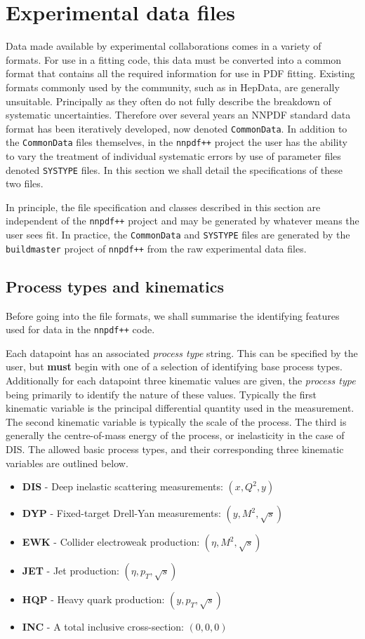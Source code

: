 \documentclass[11pt]{article}
\begin{document}
\section{Experimental data files}\label{sec:experimental}
Data made available by experimental collaborations comes in a variety of formats. For use in a fitting code, this data must be converted into a common format
that contains all the required information for use in PDF fitting. Existing formats commonly used by the community, such as in HepData, are generally unsuitable.
Principally as they often do not fully describe the breakdown of systematic uncertainties. Therefore over several years an NNPDF standard data format has been
iteratively developed, now denoted {\tt CommonData}. In addition to the {\tt CommonData} files themselves, in the {\tt nnpdf++} project the user has the ability to vary
the treatment of individual systematic errors by use of parameter files denoted {\tt SYSTYPE} files. In this section we shall detail the specifications of these two files.

In principle, the file specification and classes described in this section are independent of the {\tt nnpdf++} project and may be generated by whatever means the user sees fit.
In practice, the {\tt CommonData} and {\tt SYSTYPE} files are generated by the {\tt buildmaster} project of {\tt nnpdf++} from the raw experimental data files.

\subsection{Process types and kinematics}
Before going into the file formats, we shall summarise the identifying features used for data in the {\tt nnpdf++} code. 

Each datapoint has an associated \emph{process type} string. This can be specified by the user, but \textbf{must} begin with one of a selection of identifying base process types. Additionally for each datapoint three kinematic values are given, the \emph{process type} being primarily to identify the nature of these values. Typically the first kinematic variable is the principal differential quantity used in the measurement. The second kinematic variable is typically the scale of the process. The third is generally the centre-of-mass energy of the process, or inelasticity in the case of DIS. The allowed basic process types, and their corresponding three kinematic variables are outlined below.

\begin{itemize}
\item \textbf{DIS} - Deep inelastic scattering measurements: $(x,Q^2,y)$
\item \textbf{DYP} - Fixed-target Drell-Yan measurements: $(y,M^2,\sqrt{s})$
\item \textbf{EWK} - Collider electroweak production: $(\eta,M^2,\sqrt{s})$
\item \textbf{JET} - Jet production: $(\eta,p_T,\sqrt{s})$
\item \textbf{HQP} - Heavy quark production: $(y,p_T,\sqrt{s})$
\item \textbf{INC} - A total inclusive cross-section: $(0,0,0)$
\end{itemize}
\end{document}
